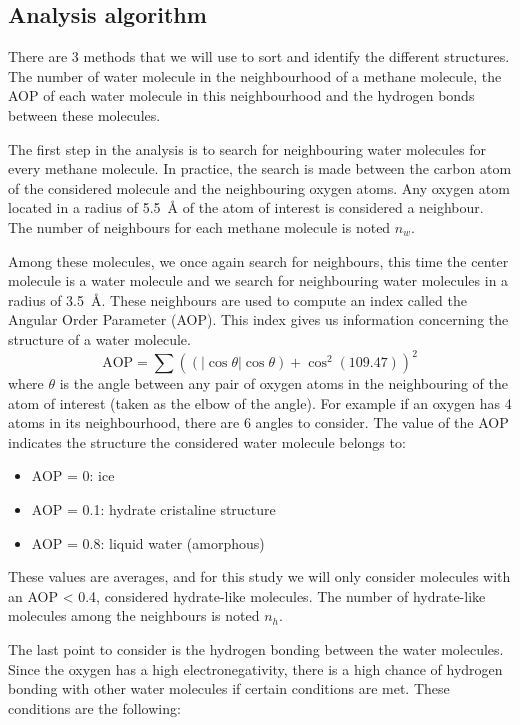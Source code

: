 \subsection{Analysis algorithm}
There are 3 methods that we will use to sort and identify the different structures. The number of water molecule in the neighbourhood of a methane molecule, the AOP of each water molecule in this neighbourhood and the hydrogen bonds between these molecules.

The first step in the analysis is to search for neighbouring water molecules for every methane molecule. In practice, the search is made between the carbon atom of the considered molecule and the neighbouring oxygen atoms. Any oxygen atom located in a radius of \SI{5.5}{\angstrom} of the atom of interest is considered a neighbour. The number of neighbours for each methane molecule is noted $n_w$.

Among these molecules, we once again search for neighbours, this time the center molecule is a water molecule and we search for neighbouring water molecules in a radius of \SI{3.5}{\angstrom}.
These neighbours are used to compute an index called the Angular Order Parameter (AOP). This index gives us information concerning the structure of a water molecule.
\[
    \text{AOP} = \sum \left( \left( \left|\cos \theta \right| \cos \theta \right) + \cos^2 (109.47)\right)^2
\]
where $\theta$ is the angle between any pair of oxygen atoms in the neighbouring of the atom of interest (taken as the elbow of the angle). For example if an oxygen has 4 atoms in its neighbourhood, there are 6 angles to consider. The value of the AOP indicates the structure the considered water molecule belongs to:

\begin{itemize}
    \item AOP = \num{0}: ice
    \item AOP = \num{0.1}: hydrate cristaline structure
    \item AOP = \num{0.8}: liquid water (amorphous)
\end{itemize}

These values are averages, and for this study we will only consider molecules with an AOP < \num{0.4}, considered hydrate-like molecules. The number of hydrate-like molecules among the neighbours is noted $n_h$.

The last point to consider is the hydrogen bonding between the water molecules. Since the oxygen has a high electronegativity, there is a high chance of hydrogen bonding with other water molecules if certain conditions are met. These conditions are the following:

